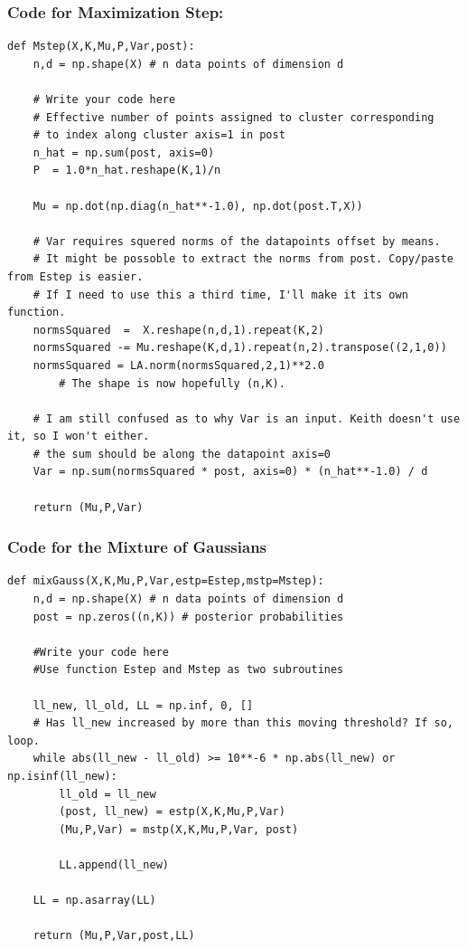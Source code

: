 \documentclass{article}
\begin{document}
\subsubsection*{Code for Maximization Step: }
    \begin{lstlisting}
def Mstep(X,K,Mu,P,Var,post):
    n,d = np.shape(X) # n data points of dimension d

    # Write your code here
    # Effective number of points assigned to cluster corresponding
    # to index along cluster axis=1 in post
    n_hat = np.sum(post, axis=0)
    P  = 1.0*n_hat.reshape(K,1)/n

    Mu = np.dot(np.diag(n_hat**-1.0), np.dot(post.T,X))

    # Var requires squered norms of the datapoints offset by means.
    # It might be possoble to extract the norms from post. Copy/paste from Estep is easier.
    # If I need to use this a third time, I'll make it its own function. 
    normsSquared  =  X.reshape(n,d,1).repeat(K,2)
    normsSquared -= Mu.reshape(K,d,1).repeat(n,2).transpose((2,1,0))
    normsSquared = LA.norm(normsSquared,2,1)**2.0
        # The shape is now hopefully (n,K).

    # I am still confused as to why Var is an input. Keith doesn't use it, so I won't either.
    # the sum should be along the datapoint axis=0
    Var = np.sum(normsSquared * post, axis=0) * (n_hat**-1.0) / d

    return (Mu,P,Var)
\end{lstlisting}

\subsubsection*{Code for the Mixture of Gaussians }
\begin{lstlisting}
def mixGauss(X,K,Mu,P,Var,estp=Estep,mstp=Mstep):
    n,d = np.shape(X) # n data points of dimension d
    post = np.zeros((n,K)) # posterior probabilities
    
    #Write your code here
    #Use function Estep and Mstep as two subroutines
    
    ll_new, ll_old, LL = np.inf, 0, []
    # Has ll_new increased by more than this moving threshold? If so, loop.
    while abs(ll_new - ll_old) >= 10**-6 * np.abs(ll_new) or  np.isinf(ll_new):
        ll_old = ll_new
        (post, ll_new) = estp(X,K,Mu,P,Var)
        (Mu,P,Var) = mstp(X,K,Mu,P,Var, post)

        LL.append(ll_new)      
        
    LL = np.asarray(LL)

    return (Mu,P,Var,post,LL)
\end{lstlisting}
\end{document}
